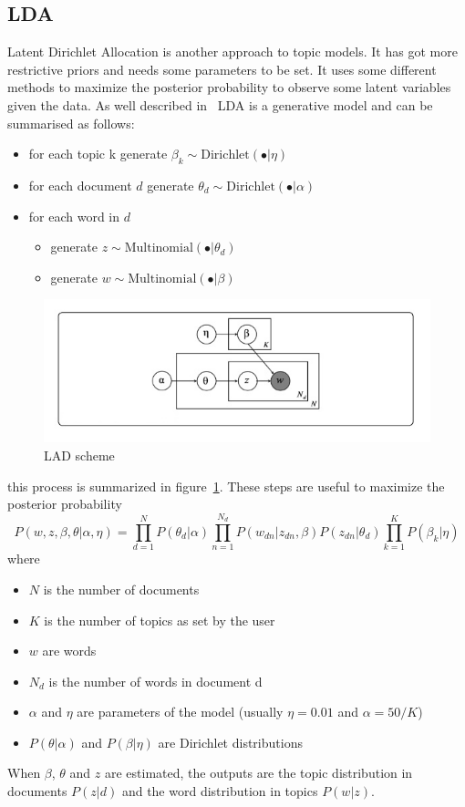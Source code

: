 \subsection{LDA}\label{sec:lda}
Latent Dirichlet Allocation is another approach to topic models. It has got more restrictive priors and needs some parameters to be set. It uses some different methods to maximize the posterior probability to observe some latent variables given the data.
As well described in~\cite{Zhou2016} LDA is a generative model and can be summarised as follows:
\begin{itemize}
	\item for each topic k generate $\beta_k\sim \text{Dirichlet}(\bullet |\eta)$
	\item for each document $d$ generate $\theta_d\sim \text{Dirichlet}(\bullet|\alpha)$
	\item for each word in $d$ 
	\begin{itemize}
		\item generate $z\sim \text{Multinomial}(\bullet|\theta_d)$
		\item generate $w\sim \text{Multinomial}(\bullet|\beta)$
	\end{itemize}
\end{itemize}
\begin{figure}[htb!]
	\centering
	\includegraphics[width=0.65\linewidth]{pictures/topic/LDA.jpeg}
	\caption{LAD scheme}
	\label{fig:LDA}
\end{figure}
this process is summarized in figure~\ref{fig:LDA}. These steps are useful to maximize the posterior probability
\begin{equation}\label{eq:lda}
P(w, z,\beta, \theta| \alpha, \eta)=\prod_{d=1}^N P(\theta_d | \alpha)\prod_{n=1}^{N_d} P(w_{dn}|z_{dn},\beta)P(z_{dn}|\theta_d)\prod_{k=1}^KP(\beta_k|\eta)
\end{equation}
where
\begin{itemize}
	\item $N$ is the number of documents
	\item $K$ is the number of topics as set by the user
	\item $w$ are words
	\item $N_d$ is the number of words in document d
	\item $\alpha$ and $\eta$ are parameters of the model (usually $\eta=0.01$ and $\alpha=50/K$)
	\item $P(\theta | \alpha)$ and $P(\beta|\eta)$ are Dirichlet distributions
\end{itemize}
When $\beta$, $\theta$ and $z$ are estimated, the outputs are the topic distribution in documents $P(z|d)$ and the word distribution in topics $P(w|z)$.